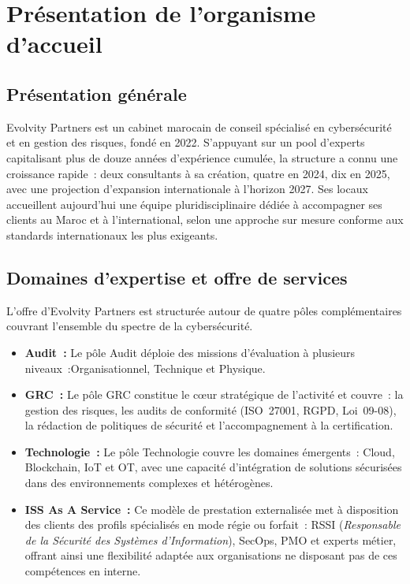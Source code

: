 \documentclass[a4paper,12pt,oneside]{report}
\begin{document}
	\section{Pr\'esentation de l'organisme d'accueil}
	
	\subsection{Pr\'esentation g\'en\'erale}
	Evolvity Partners est un cabinet marocain de conseil sp\'ecialis\'e en cybers\'ecurit\'e et en gestion des risques, fond\'e en 2022. S'appuyant sur un pool d'experts capitalisant plus de douze ann\'ees d'exp\'erience cumul\'ee, la structure a connu une croissance rapide~: deux consultants \`a sa cr\'eation, quatre en 2024, dix en 2025, avec une projection d'expansion internationale \`a l'horizon 2027. Ses locaux accueillent aujourd'hui une \'equipe pluridisciplinaire d\'edi\'ee \`a accompagner ses clients au Maroc et \`a l'international, selon une approche sur mesure conforme aux standards internationaux les plus exigeants. 
	\subsection{Domaines d'expertise et offre de services}
	
	L'offre d'Evolvity Partners est structur\'ee autour de quatre p\^oles compl\'ementaires couvrant l'ensemble du spectre de la cybers\'ecurit\'e.
	
	\begin{itemize}
		\item \textbf{Audit~:} Le p\^ole Audit d\'eploie des missions d'\'evaluation \`a plusieurs niveaux~:Organisationnel, Technique et Physique.
		\item \textbf{GRC~:} Le p\^ole GRC constitue le c\oe ur strat\'egique de l'activit\'e et couvre~: la gestion des risques, les audits de conformit\'e (ISO~27001, RGPD, Loi~09-08), la r\'edaction de politiques de s\'ecurit\'e et l'accompagnement \`a la certification.
		\item \textbf{Technologie~:} Le p\^ole Technologie couvre les domaines \'emergents~: Cloud, Blockchain, IoT et OT, avec une capacit\'e d'int\'egration de solutions s\'ecuris\'ees dans des environnements complexes et h\'et\'erog\`enes.
		\item \textbf{ISS As A Service~:} Ce mod\`ele de prestation externalis\'ee met \`a disposition des clients des profils sp\'ecialis\'es en mode r\'egie ou forfait~: RSSI (\textit{Responsable de la S\'ecurit\'e des Syst\`emes d'Information}), SecOps, PMO et experts m\'etier, offrant ainsi une flexibilit\'e adapt\'ee aux organisations ne disposant pas de ces comp\'etences en interne.
		
	\end{itemize}
	
\end{document}

